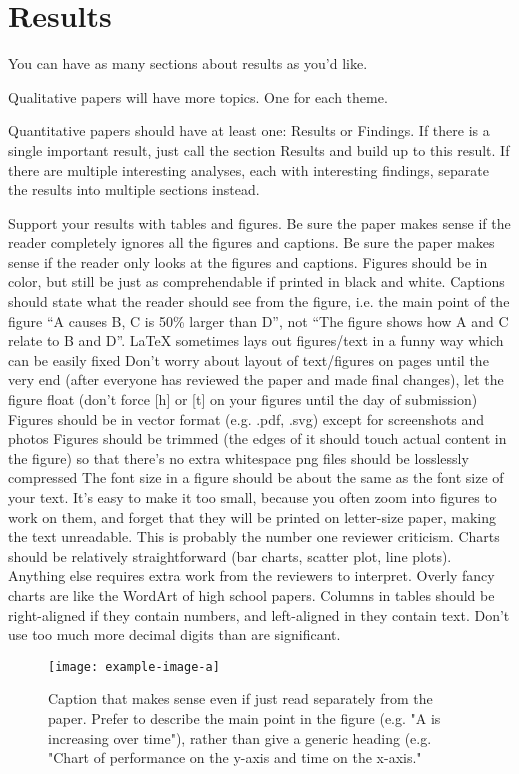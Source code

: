 \documentclass[manuscript,review,anonymous]{acmart}
\begin{document}
\section{Results}
You can have as many sections about results as you'd like.

Qualitative papers will have more topics.
One for each theme.

Quantitative papers should have at least one: Results or Findings.
If there is a single important result, just call the section Results and build up to this result.
If there are multiple interesting analyses, each with interesting findings, separate the results into multiple sections instead.

Support your results with tables and figures.
Be sure the paper makes sense if the reader completely ignores all the figures and captions.
Be sure the paper makes sense if the reader only looks at the figures and captions.
Figures should be in color, but still be just as comprehendable if printed in black and white.
Captions should state what the reader should see from the figure, i.e. the main point of the figure ``A causes B, C is 50\% larger than D'', not ``The figure shows how A and C relate to B and D''.
LaTeX sometimes lays out figures/text in a funny way which can be easily fixed
Don't worry about layout of text/figures on pages until the very end (after everyone has reviewed the paper and made final changes), let the figure float (don't force [h] or [t] on your figures until the day of submission)
Figures should be in vector format (e.g. .pdf, .svg) except for screenshots and photos
Figures should be trimmed (the edges of it should touch actual content in the figure) so that there's no extra whitespace
png files should be losslessly compressed
The font size in a figure should be about the same as the font size of your text. It's easy to make it too small, because you often zoom into figures to work on them, and forget that they will be printed on letter-size paper, making the text unreadable. This is probably the number one reviewer criticism.
Charts should be relatively straightforward (bar charts, scatter plot, line plots). Anything else requires extra work from the reviewers to interpret. Overly fancy charts are like the WordArt of high school papers.
Columns in tables should be right-aligned if they contain numbers, and left-aligned in they contain text. Don't use too much more decimal digits than are significant.

\begin{figure}
  \centering
    \texttt{[image: example-image-a]}
    \caption{Caption that makes sense even if just read separately from the paper. Prefer to describe the main point in the figure (e.g. "A is increasing over time"), rather than give a generic heading (e.g. "Chart of performance on the y-axis and time on the x-axis."}
    \label{fig:example_figure}
\end{figure}
\end{document}
